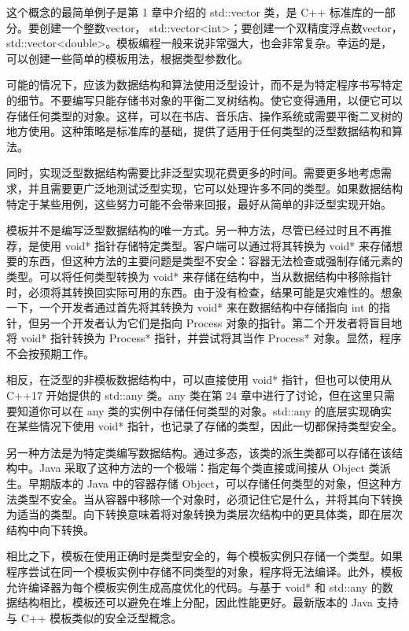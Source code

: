这个概念的最简单例子是第 1 章中介绍的 std::vector 类，是 C++ 标准库的一部分。要创建一个整数vector， std::vector<int>；要创建一个双精度浮点数vector，std::vector<double>。模板编程一般来说非常强大，也会非常复杂。幸运的是，可以创建一些简单的模板用法，根据类型参数化。

可能的情况下，应该为数据结构和算法使用泛型设计，而不是为特定程序书写特定的细节。不要编写只能存储书对象的平衡二叉树结构。使它变得通用，以便它可以存储任何类型的对象。这样，可以在书店、音乐店、操作系统或需要平衡二叉树的地方使用。这种策略是标准库的基础，提供了适用于任何类型的泛型数据结构和算法。

同时，实现泛型数据结构需要比非泛型实现花费更多的时间。需要更多地考虑需求，并且需要更广泛地测试泛型实现，它可以处理许多不同的类型。如果数据结构特定于某些用例，这些努力可能不会带来回报，最好从简单的非泛型实现开始。


模板并不是编写泛型数据结构的唯一方式。另一种方法，尽管已经过时且不再推荐，是使用 void* 指针存储特定类型。客户端可以通过将其转换为 void* 来存储想要的东西，但这种方法的主要问题是类型不安全：容器无法检查或强制存储元素的类型。可以将任何类型转换为 void* 来存储在结构中，当从数据结构中移除指针时，必须将其转换回实际可用的东西。由于没有检查，结果可能是灾难性的。想象一下，一个开发者通过首先将其转换为 void* 来在数据结构中存储指向 int 的指针，但另一个开发者认为它们是指向 Process 对象的指针。第二个开发者将盲目地将 void* 指针转换为 Process* 指针，并尝试将其当作 Process* 对象。显然，程序不会按预期工作。

相反，在泛型的非模板数据结构中，可以直接使用 void* 指针，但也可以使用从 C++17 开始提供的 std::any 类。any 类在第 24 章中进行了讨论，但在这里只需要知道你可以在 any 类的实例中存储任何类型的对象。std::any 的底层实现确实在某些情况下使用 void* 指针，也记录了存储的类型，因此一切都保持类型安全。

另一种方法是为特定类编写数据结构。通过多态，该类的派生类都可以存储在该结构中。Java 采取了这种方法的一个极端：指定每个类直接或间接从 Object 类派生。早期版本的 Java 中的容器存储 Object，可以存储任何类型的对象，但这种方法类型不安全。当从容器中移除一个对象时，必须记住它是什么，并将其向下转换为适当的类型。向下转换意味着将对象转换为类层次结构中的更具体类，即在层次结构中向下转换。

相比之下，模板在使用正确时是类型安全的，每个模板实例只存储一个类型。如果程序尝试在同一个模板实例中存储不同类型的对象，程序将无法编译。此外，模板允许编译器为每个模板实例生成高度优化的代码。与基于 void* 和 std::any 的数据结构相比，模板还可以避免在堆上分配，因此性能更好。最新版本的 Java 支持与 C++ 模板类似的安全泛型概念。

